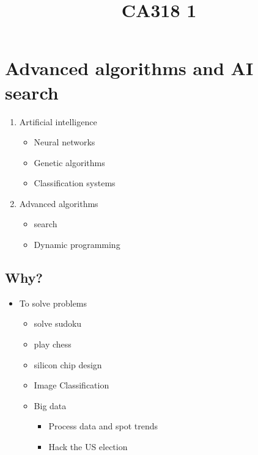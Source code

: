 \documentclass{article}
\title{CA318 1}
\begin{document}
    \section{Advanced algorithms and AI search}
    \begin{enumerate}
        \item{Artificial intelligence}
            \begin{itemize}
                \item{Neural networks}
                \item{Genetic algorithms}
                \item{Classification systems}
            \end{itemize}

        \item{Advanced algorithms}
            \begin{itemize}
                \item{search}
                \item{Dynamic programming}
            \end{itemize}
    \end{enumerate}

    \subsection{Why?}
    \begin{itemize}
        \item{To solve problems}
            \begin{itemize}
                \item{solve sudoku}
                \item{play chess}
                \item{silicon chip design}
                \item{Image Classification}
                \item{Big data}
                    \begin{itemize}
                        \item{Process data and spot trends}
                        \item{Hack the US election}
                    \end{itemize}
            \end{itemize}
    \end{itemize}
\end{document}
